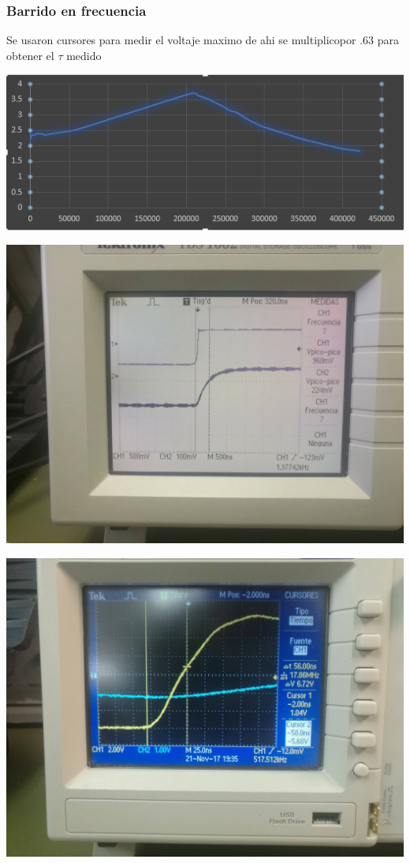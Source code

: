 \documentclass[12pt,letterpaper]{IEEEtran}
\begin{document}
	\subsubsection{\textbf{Barrido en frecuencia}}
	Se usaron cursores para medir el voltaje maximo de ahi se multiplicopor .63 para obtener el $\tau$ medido
	\begin{center}
		
		\includegraphics[width=0.8\linewidth]{resp}
		
	\end{center}
	
	\begin{center}
		
		\includegraphics[width=0.8\linewidth]{rd}
		
	\end{center}
	\begin{center}
		
		\includegraphics[width=0.8\linewidth]{de}
		
	\end{center}
	
\end{document}
